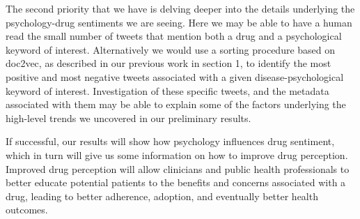 The second priority that we have is delving deeper into the details underlying the psychology-drug sentiments we are seeing. Here we may be able to have a human read the small number of tweets that mention both a drug and a psychological keyword of interest. Alternatively we would use a sorting procedure based on doc2vec, as described in our previous work in section 1, to identify the most positive and most negative tweets associated with a given disease-psychological keyword of interest. Investigation of these specific tweets, and the metadata associated with them may be able to explain some of the factors underlying the high-level trends we uncovered in our preliminary results.

If successful, our results will show how psychology influences drug sentiment, which in turn will give us some information on how to improve drug perception. Improved drug perception will allow clinicians and public health professionals to better educate potential patients to the benefits and concerns associated with a drug, leading to better adherence, adoption, and eventually better health outcomes.

